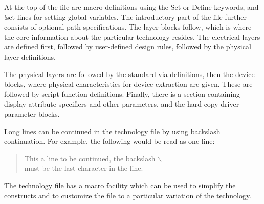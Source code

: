 At the top of the file are macro definitions using the {\vt Set} or
{\vt Define} keywords, and {\cb !set} lines for setting global
variables.  The introductory part of the file further consists of
optional path specifications.  The layer blocks follow, which is where
the core information about the particular technology resides.  The
electrical layers are defined first, followed by user-defined design
rules, followed by the physical layer definitions.

The physical layers are followed by the standard via definitions, then
the device blocks, where physical characteristics for device
extraction are given.  These are followed by script function
definitions.  Finally, there is a section containing display attribute
specifiers and other parameters, and the hard-copy driver parameter
blocks.

Long lines can be continued in the technology file by using backslash
continuation.  For example, the following would be read as one line:
\begin{samepage}
\begin{quote}\vt
    This a line to be continued, the backslash $\backslash$ \\
    must be the last character in the line.
\end{quote}
\end{samepage}

The technology file has a macro facility which can be used to simplify
the constructs and to customize the file to a particular variation of
the technology.

